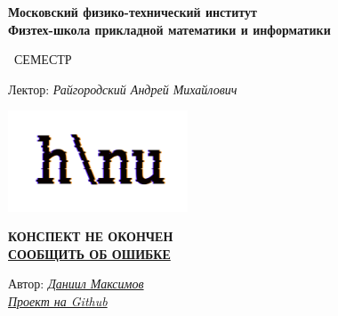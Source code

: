 \begin{titlepage}
	\clearpage\thispagestyle{empty}
	\centering
	
	\textbf{Московский физико-технический институт \\ Физтех-школа прикладной математики и информатики}
	\vspace{33ex}
	
	{\textbf{\FullCourseNameFirstPart}}
	
	\SemesterNumber\ СЕМЕСТР  
	\vspace{1ex}
	\begin{center}
		Лектор: \textit{Райгородский Андрей Михайлович}
	\end{center}
	
	\includegraphics[width=0.4\textwidth]{images/logo_ltc.png}
	
	{\large \textbf{КОНСПЕКТ НЕ ОКОНЧЕН}
	\\
	\href{https://docs.google.com/forms/d/e/1FAIpQLScwRADR8xumAcVm1nxHoKjZtu0Q2i1cbFoxYyD3HpJilvQ69A/viewform?usp=sf_link}{\textbf{СООБЩИТЬ ОБ ОШИБКЕ}}}

	\begin{flushright}
		\noindent
		Автор: \href{https://vk.com/wolfawi}{\textit{Даниил Максимов}}
		\\
		\href{\GithubLink}{\textit{Проект на Github}}
	\end{flushright}
	
	\vfill
	\CourseDate
	\pagebreak
\end{titlepage}
